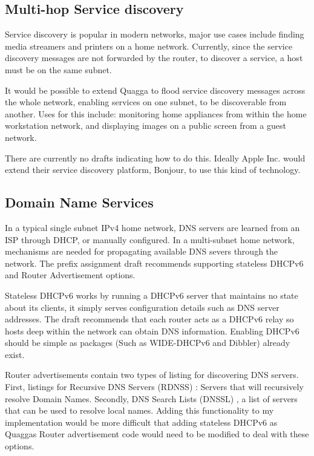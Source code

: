 \documentclass[12pt,a4paper,twoside]{report}
\begin{document}
\subsection{Multi-hop Service discovery}
Service discovery is popular in modern networks, major use cases include
finding media streamers and printers on a home network. Currently, since the
service discovery messages are not forwarded by the router, to discover a
service, a host must be on the same subnet.

It would be possible to extend Quagga to flood service discovery
messages across the whole network, enabling services on one subnet, to be
discoverable from another. Uses for this include: monitoring home appliances from
within the home workstation network, and displaying images on a public screen
from a guest network.

There are currently no drafts indicating how to do this. Ideally Apple Inc.\@
would extend their service discovery platform, Bonjour, to use this kind of
technology.

\subsection{Domain Name Services}
In a typical single subnet IPv4 home network, DNS servers are learned from an
ISP through DHCP, or manually configured. In a multi-subnet home network,
mechanisms are needed for propagating available DNS severs through the network.
The prefix assignment draft recommends supporting stateless DHCPv6 and Router
Advertisement options.

Stateless DHCPv6 works by running a DHCPv6 server that maintains no state about
its clients, it simply serves configuration details such as DNS server
addresses. The draft recommends that each router acts as a DHCPv6 relay so
hosts deep within the network can obtain DNS information.  Enabling DHCPv6
should be simple as packages (Such as WIDE-DHCPv6 and Dibbler) already exist. 

Router advertisements contain two types of listing for discovering DNS servers.
First, listings for Recursive DNS Servers (RDNSS)
: Servers that will recursively
resolve Domain Names. Secondly, DNS Search Lists (DNSSL)
, a list of servers that can be used to
resolve local names. Adding this functionality to my implementation would be
more difficult that adding stateless DHCPv6 as Quaggas Router advertisement
code would need to be modified to deal with these options.
\end{document}
